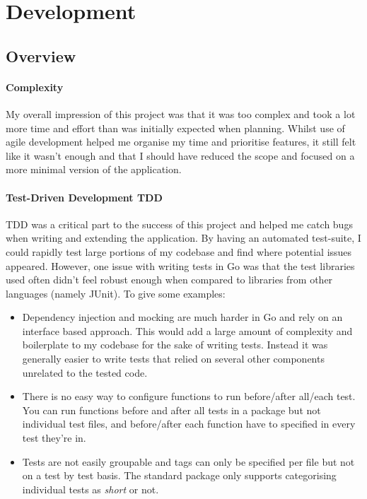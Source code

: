 \section{Development}

\subsection{Overview}

\paragraph*{Complexity}
My overall impression of this project was that it was too complex and took a lot more time and effort than was initially expected when planning. Whilst use of agile development helped me organise my time and prioritise features, it still felt like it wasn't enough and that I should have reduced the scope and focused on a more minimal version of the application.



\paragraph*{Test-Driven Development TDD}
TDD was a critical part to the success of this project and helped me catch bugs when writing and extending the application. By having an automated test-suite, I could rapidly test large portions of my codebase and find where potential issues appeared. 
\x
However, one issue with writing tests in Go was that the test libraries used often didn't feel robust enough when compared to libraries from other languages (namely JUnit). To give some examples:

\begin{itemize}
  \item Dependency injection and mocking are much harder in Go and rely on an interface based approach. This would add a large amount of complexity and boilerplate to my codebase for the sake of writing tests. Instead it was generally easier to write tests that relied on several other components unrelated to the tested code.
  \item There is no easy way to configure functions to run before/after all/each test. You can run functions before and after all tests in a package but not individual test files, and before/after each function have to specified in every test they're in. 
  \item Tests are not easily groupable and tags can only be specified per file but not on a test by test basis. The standard package only supports categorising individual tests as \textit{short} or not.
\end{itemize}